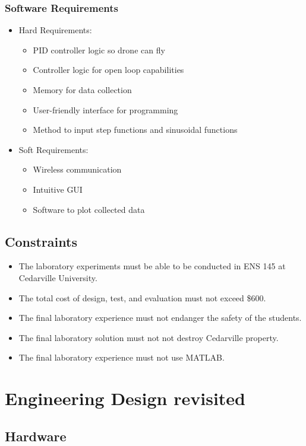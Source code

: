 \documentclass[12pt, titlepage]{article}
\begin{document}
\subsubsection{Software Requirements}
\begin{itemize}
  \item Hard Requirements:
  \begin{itemize}
    \item PID controller logic so drone can fly
    \item Controller logic for open loop capabilities
    \item Memory for data collection
    \item User-friendly interface for programming
    \item Method to input step functions and sinusoidal functions
  \end{itemize}
  \item Soft Requirements:
  \begin{itemize}
    \item Wireless communication
    \item Intuitive GUI
    \item Software to plot collected data
  \end{itemize}
\end{itemize}
\subsection{Constraints}
\begin{itemize}
  \item The laboratory experiments must be able to be conducted in ENS 145 at Cedarville University.
  \item The total cost of design, test, and evaluation must not exceed \$600.
  \item The final laboratory experience must not endanger the safety of the students.
  \item The final laboratory solution must not not destroy Cedarville property.
  \item The final laboratory experience must not use MATLAB.
\end{itemize}

\section{Engineering Design revisited}
\subsection{Hardware}
\end{document}
